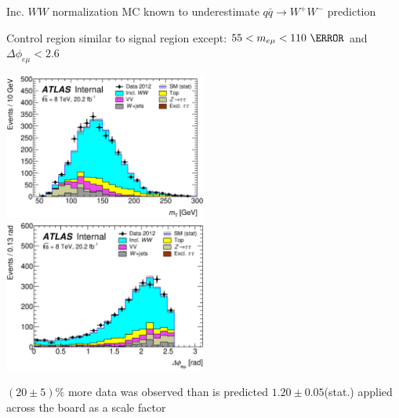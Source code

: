 \documentclass[10pt]{beamer}
\newcommand*{\memu}{\ensuremath{m_{e\mu}}}
\newcommand*{\dFem}{\ensuremath{\Delta\phi_{e\mu}}}
\begin{document}
\begin{frame}{Inc. $WW$ normalization}
\centering
{\large\color{blue} MC known to underestimate $q\bar{q}\rightarrow W^{+}W^{-}$ prediction}
\begin{outline}
\1 Control region similar to signal region except:
	\2 $55 < \memu < 110~\GeV$ and $\dFem<2.6$
\end{outline}
   \includegraphics[width=0.5\textwidth]{figures/emme-CutNjets-MT-lin.eps}
   \includegraphics[width=0.5\textwidth]{figures/emme-CutNjets-DPhill-lin.eps}
\begin{outline}
\1 $(20 \pm 5)\%$ more data was observed than is predicted
	\2 $1.20 \pm 0.05$(stat.) applied across the board as a scale factor
\end{outline}
\end{frame}
\end{document}
